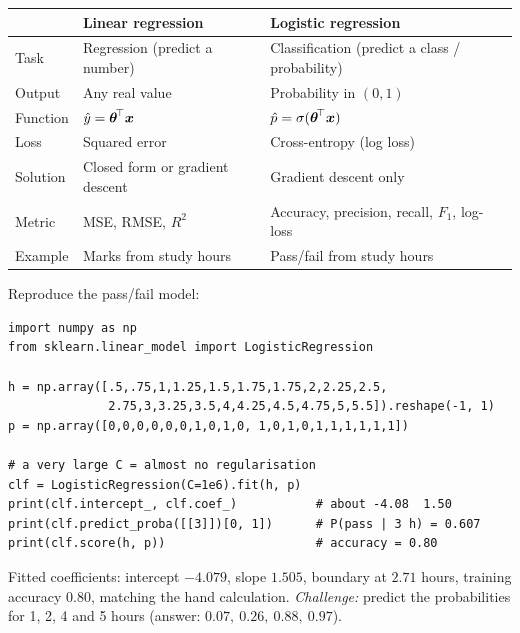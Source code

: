 \begin{center}
\begin{tabular}{@{}p{3.5cm}p{4.9cm}p{4.9cm}@{}}
\toprule
 & \textbf{Linear regression} & \textbf{Logistic regression}\\
\midrule
Task & Regression (predict a number) & Classification (predict a class / probability)\\
Output & Any real value & Probability in $(0,1)$\\
Function & $\hat y=\boldsymbol{\theta}^{\!\top}\boldsymbol{x}$ & $\hat p=\sigma(\boldsymbol{\theta}^{\!\top}\boldsymbol{x})$\\
Loss & Squared error & Cross-entropy (log loss)\\
Solution & Closed form or gradient descent & Gradient descent only\\
Metric & MSE, RMSE, $R^2$ & Accuracy, precision, recall, $F_1$, log-loss\\
Example & Marks from study hours & Pass/fail from study hours\\
\bottomrule
\end{tabular}
\end{center}

\begin{tryit}
Reproduce the pass/fail model:
\begin{lstlisting}
import numpy as np
from sklearn.linear_model import LogisticRegression

h = np.array([.5,.75,1,1.25,1.5,1.75,1.75,2,2.25,2.5,
              2.75,3,3.25,3.5,4,4.25,4.5,4.75,5,5.5]).reshape(-1, 1)
p = np.array([0,0,0,0,0,0,1,0,1,0, 1,0,1,0,1,1,1,1,1,1])

# a very large C = almost no regularisation
clf = LogisticRegression(C=1e6).fit(h, p)
print(clf.intercept_, clf.coef_)           # about -4.08  1.50
print(clf.predict_proba([[3]])[0, 1])      # P(pass | 3 h) = 0.607
print(clf.score(h, p))                     # accuracy = 0.80
\end{lstlisting}
Fitted coefficients: intercept $-4.079$, slope $1.505$, boundary at $2.71$ hours, training accuracy $0.80$, matching the hand calculation. \emph{Challenge:} predict the probabilities for 1, 2, 4 and 5 hours (answer: $0.07,\ 0.26,\ 0.88,\ 0.97$).
\end{tryit}


